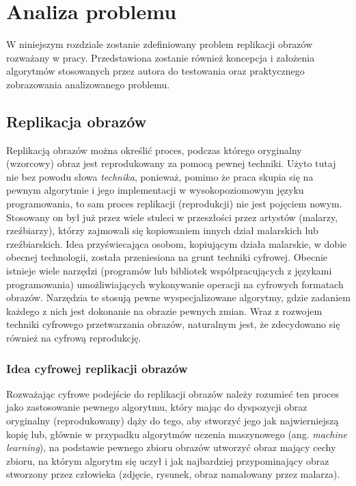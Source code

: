 \chapter{Analiza problemu}
\thispagestyle{chapterBeginStyle}
\label{rozdzial1}

W niniejszym rozdziale zostanie zdefiniowany problem replikacji obrazów rozważany w pracy. Przedstawiona zostanie również koncepcja i założenia algorytmów stosowanych przez autora do testowania oraz praktycznego zobrazowania analizowanego problemu.

\section{Replikacja obrazów}
 
Replikacją obrazów można określić proces, podczas którego oryginalny (wzorcowy) obraz jest reprodukowany za pomocą pewnej techniki. Użyto tutaj nie bez powodu słowa \textit{technika}, ponieważ, pomimo że praca skupia się na pewnym algorytmie i jego implementacji w wysokopoziomowym języku programowania, to sam proces replikacji (reprodukcji) nie jest pojęciem nowym. Stosowany on był już przez wiele stuleci w przeszłości przez artystów (malarzy, rzeźbiarzy), którzy zajmowali się kopiowaniem innych dział malarskich lub rzeźbiarskich. Idea przyświecająca osobom, kopiującym działa malarskie, w dobie obecnej technologii, została przeniesiona na grunt techniki cyfrowej. Obecnie istnieje wiele narzędzi (programów lub bibliotek współpracujących z językami programowania) umożliwiających wykonywanie operacji na cyfrowych formatach obrazów. Narzędzia te stosują pewne wyspecjalizowane algorytmy, gdzie zadaniem każdego z nich jest dokonanie na obrazie pewnych zmian. Wraz z rozwojem techniki cyfrowego przetwarzania obrazów, naturalnym jest, że zdecydowano się również na cyfrową reprodukcję.

\subsection{Idea cyfrowej replikacji obrazów}

Rozważając cyfrowe podejście do replikacji obrazów należy rozumieć ten proces jako zastosowanie pewnego algorytmu, który mając do dyspozycji obraz oryginalny (reprodukowany) dąży do tego, aby stworzyć jego jak najwierniejszą kopię lub, głównie w przypadku algorytmów uczenia maszynowego (ang. \textit{machine learning}), na podstawie pewnego zbioru obrazów utworzyć obraz mający cechy zbioru, na którym algorytm się uczył i jak najbardziej przypominający obraz stworzony przez człowieka (zdjęcie, rysunek, obraz namalowany przez malarza).

